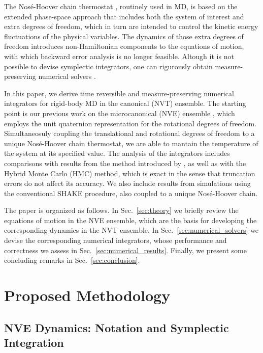 \documentclass[
journal=jctcce,
layout=twocolumn
]{achemso}
\begin{document}
The Nos\'{e}-Hoover chain thermostat \cite{Martyna_1992}, routinely used in MD, is based on the extended phase-space approach that includes both the system of interest and extra degrees of freedom, which in turn are intended to control the kinetic energy fluctuations of the physical variables.
The dynamics of those extra degrees of freedom introduces non-Hamiltonian components to the equations of motion, with which backward error analysis is no longer feasible.
Altough it is not possible to devise symplectic integrators, one can rigurously obtain measure-preserving numerical solvers \cite{Sergi_2001, Ezra_2004, Ezra_2006}.

In this paper, we derive time reversible and measure-preserving numerical integrators for rigid-body MD in the canonical (NVT) ensemble.
The starting point is our previous work on the microcanonical (NVE) ensemble \cite{Silveira_2017}, which employs the unit quaternion representation for the rotational degrees of freedom.
Simultaneosuly coupling the translational and rotational degrees of freedom to a unique Nos\'{e}-Hoover chain thermostat, we are able to mantain the temperature of the system at its specified value.
The analysis of the integrators includes comparisons with results from the method introduced by \citeauthor{Kamberaj_2005} \cite{Kamberaj_2005}, as well as with the Hybrid Monte Carlo (HMC) method,\cite{Duane_1987} which is exact in the sense that truncation errors do not affect its accuracy.
We also include results from simulations using the conventional SHAKE \cite{Ryckaert_1977} procedure, also coupled to a unique Nos\'{e}-Hoover chain.

The paper is organized as follows.
In Sec.~\ref{sec:theory} we briefly review the equations of motion in the NVE ensemble, which are the basis for developing the corresponding dynamics in the NVT ensemble.
In Sec.~\ref{sec:numerical_solvers} we devise the corresponding numerical integrators, whose performance and correctness we assess in Sec.~\ref{sec:numerical_results}.
Finally, we present some concluding remarks in Sec.~\ref{sec:conclusion}.

\section{Proposed Methodology}
\label{sec:methodology}

\subsection{NVE Dynamics: Notation and Symplectic Integration}
\end{document}
